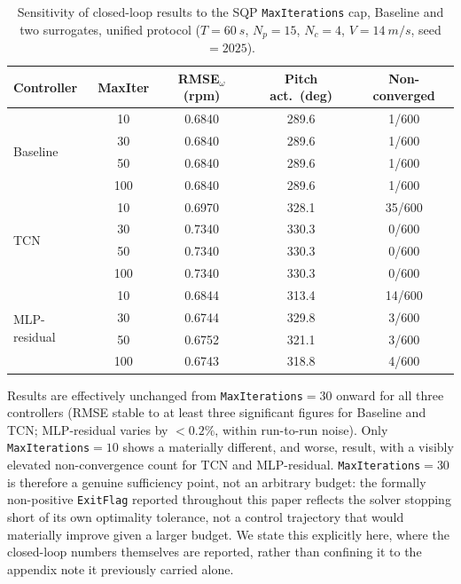 \begin{table}[H]
\centering
\caption{Sensitivity of closed-loop results to the SQP
\texttt{MaxIterations} cap, Baseline and two surrogates, unified
protocol ($T=\SI{60}{s}$, $N_p=15$, $N_c=4$, $V=\SI{14}{m/s}$,
seed$=2025$).}
\label{tab:maxiter_sensitivity}
\begin{tabular}{lcccc}
\toprule
Controller & MaxIter & RMSE$_\omega$ (rpm) & Pitch act.\ (deg) & Non-converged \\
\midrule
\multirow{4}{*}{Baseline}
 & 10  & 0.6840 & 289.6 & 1/600 \\
 & 30  & 0.6840 & 289.6 & 1/600 \\
 & 50  & 0.6840 & 289.6 & 1/600 \\
 & 100 & 0.6840 & 289.6 & 1/600 \\
\midrule
\multirow{4}{*}{TCN}
 & 10  & 0.6970 & 328.1 & 35/600 \\
 & 30  & 0.7340 & 330.3 & 0/600 \\
 & 50  & 0.7340 & 330.3 & 0/600 \\
 & 100 & 0.7340 & 330.3 & 0/600 \\
\midrule
\multirow{4}{*}{MLP-residual}
 & 10  & 0.6844 & 313.4 & 14/600 \\
 & 30  & 0.6744 & 329.8 & 3/600 \\
 & 50  & 0.6752 & 321.1 & 3/600 \\
 & 100 & 0.6743 & 318.8 & 4/600 \\
\bottomrule
\end{tabular}
\end{table}

\hspace{1.5cm} Results are effectively unchanged from
\texttt{MaxIterations}$=30$ onward for all three controllers (RMSE
stable to at least three significant figures for Baseline and TCN;
MLP-residual varies by $<0.2\%$, within run-to-run noise). Only
\texttt{MaxIterations}$=10$ shows a materially different, and worse,
result, with a visibly elevated non-convergence count for TCN and
MLP-residual. \texttt{MaxIterations}$=30$ is therefore a genuine
sufficiency point, not an arbitrary budget: the formally non-positive
\texttt{ExitFlag} reported throughout this paper reflects the solver
stopping short of its own optimality tolerance, not a control
trajectory that would materially improve given a larger budget. We
state this explicitly here, where the closed-loop numbers themselves
are reported, rather than confining it to the appendix note it
previously carried alone.

